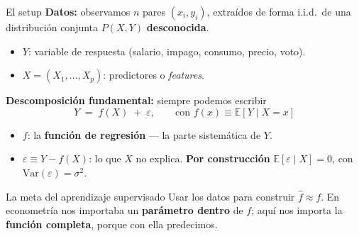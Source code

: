 \documentclass{beamer}
\newcommand{\E}{\mathbb{E}}
\newcommand{\Var}{\mathrm{Var}}
\newcommand{\1}{\mathbb{I}}
\begin{document}
\begin{frame}{El setup}
\small
\textbf{Datos:} observamos $n$ pares $(x_i, y_i)$, extraídos de forma i.i.d.\ de una distribución conjunta $P(X, Y)$ \textbf{desconocida}.
\begin{itemize}\itemsep3pt
  \item $Y$: variable de respuesta (salario, impago, consumo, precio, voto).
  \item $X = (X_1, \ldots, X_p)$: predictores o \emph{features}.
\end{itemize}
\pause

\vspace{0.2cm}
\textbf{Descomposición fundamental:} siempre podemos escribir
\[ Y \;=\; f(X) \;+\; \varepsilon, \qquad \text{con } f(x) \equiv \E[Y \mid X = x] \]
\begin{itemize}\itemsep3pt
  \item $f$: la \textbf{función de regresión} --- la parte sistemática de $Y$.
  \item $\varepsilon \equiv Y - f(X)$: lo que $X$ no explica. \textbf{Por construcción} $\E[\varepsilon \mid X] = 0$, con $\Var(\varepsilon) = \sigma^2$.
\end{itemize}
\pause

\vspace{0.2cm}
\begin{block}{La meta del aprendizaje supervisado}
Usar los datos para construir $\hat{f} \approx f$. En econometría nos importaba un \textbf{parámetro dentro} de $f$; aquí nos importa la \textbf{función completa}, porque con ella predecimos.
\end{block}
\end{frame}
\end{document}
